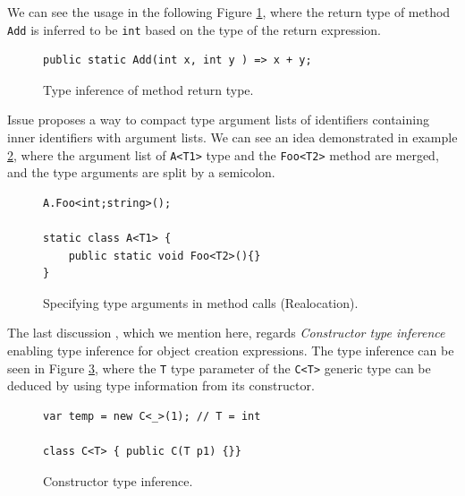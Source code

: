 We can see the usage in the following Figure \ref{img64:TMRetInf}, where the return type of method \texttt{Add} is inferred to be \texttt{int} based on the type of the return expression.
\par
\begin{figure}[t]
\begin{lstlisting}[style=csharp]
public static Add(int x, int y ) => x + y;
\end{lstlisting}
\caption{Type inference of method return type.}
\label{img64:TMRetInf}
\end{figure}
\par
{}
Issue \cite{online:Realloc} proposes a way to compact type argument lists of identifiers containing inner identifiers with argument lists. 
We can see an idea demonstrated in example \ref{img65:Realloc}, where the argument list of \texttt{A<T1>} type and the \texttt{Foo<T2>} method are merged, and the type arguments are split by a semicolon.
\par
\begin{figure}[b]
\begin{lstlisting}[style=csharp]
A.Foo<int;string>();

static class A<T1> {
    public static void Foo<T2>(){}
}
\end{lstlisting}
\caption{Specifying type arguments in method calls (Realocation).}
\label{img65:Realloc}
\end{figure}
\par
{}
The last discussion \cite{online:CtorTInf}, which we mention here, regards \textit{Constructor type inference} enabling type inference for object creation expressions. 
The type inference can be seen in Figure \ref{img66:CtorTInf}, where the \texttt{T} type parameter of the \texttt{C<T>} generic type can be deduced by using type information from its constructor.
\par
\begin{figure}[b!]
\begin{lstlisting}[style=csharp]
var temp = new C<_>(1); // T = int

class C<T> { public C(T p1) {}}
\end{lstlisting}
\caption{Constructor type inference.}
\label{img66:CtorTInf}
\end{figure}
